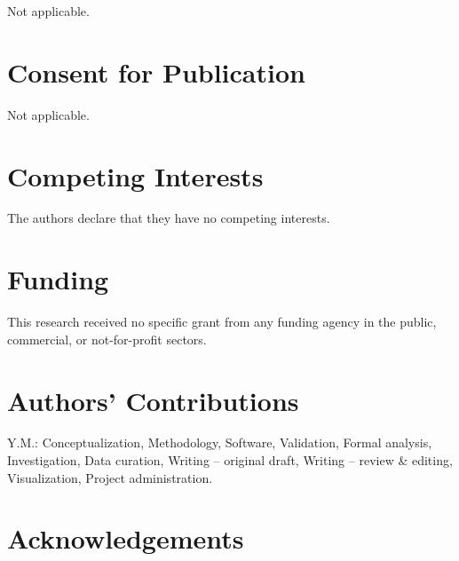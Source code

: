 \documentclass[11pt,a4paper]{article}
\begin{document}
Not applicable.

\section{Consent for Publication}

Not applicable.

\section{Competing Interests}

The authors declare that they have no competing interests.

\section{Funding}

This research received no specific grant from any funding agency in the public, commercial, or not-for-profit sectors.

\section{Authors' Contributions}

Y.M.: Conceptualization, Methodology, Software, Validation, Formal analysis, Investigation, Data curation, Writing -- original draft, Writing -- review \& editing, Visualization, Project administration.

\section{Acknowledgements}
\end{document}
